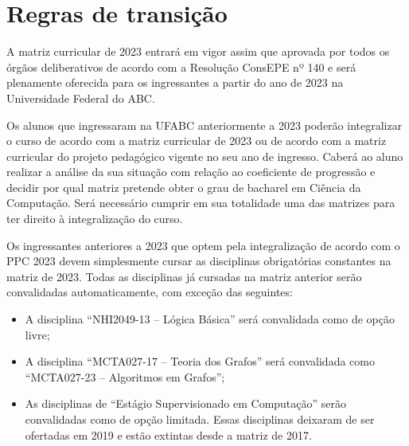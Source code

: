 \section{Regras de transição}
\label{sec:regras_transicao}

A matriz curricular de 2023 entrará em vigor assim que aprovada por todos os
órgãos deliberativos de acordo com a Resolução ConsEPE nº 140 e será plenamente
oferecida para os ingressantes a partir do ano de 2023 na Universidade Federal
do ABC.

Os alunos que ingressaram na UFABC anteriormente a 2023 poderão integralizar o
curso de acordo com a matriz curricular de 2023 ou de acordo com a matriz
curricular do projeto pedagógico vigente no seu ano de ingresso.
Caberá ao aluno realizar a análise da sua situação com relação ao coeficiente
de progressão e decidir por qual matriz pretende obter o grau de bacharel em
Ciência da Computação.
Será necessário cumprir em sua totalidade uma das matrizes para ter direito à
integralização do curso.

Os ingressantes anteriores a 2023 que optem pela integralização de acordo com
o PPC 2023 devem simplesmente cursar as disciplinas obrigatórias constantes na
matriz de 2023.
Todas as disciplinas já cursadas na matriz anterior serão convalidadas
automaticamente, com exceção das seguintes:
\begin{itemize}
    \item A disciplina ``NHI2049-13 -- Lógica Básica'' será convalidada como de
    opção livre;
    \item A disciplina ``MCTA027-17 -- Teoria dos Grafos'' será convalidada
    como ``MCTA027-23 -- Algoritmos em Grafos'';
    \item As disciplinas de ``Estágio Supervisionado em Computação'' serão
    convalidadas como de opção limitada. Essas disciplinas deixaram de ser
    ofertadas em 2019 e estão extintas desde a matriz de 2017.
\end{itemize}

